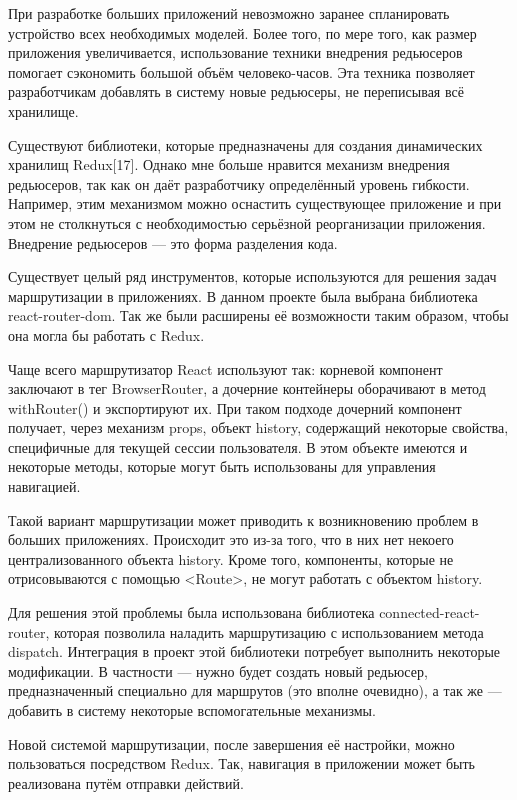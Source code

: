 При разработке больших приложений невозможно заранее спланировать устройство всех необходимых моделей.
Более того, по мере того, как размер приложения увеличивается, использование техники внедрения редьюсеров помогает сэкономить большой объём человеко-часов.
Эта техника позволяет разработчикам добавлять в систему новые редьюсеры, не переписывая всё хранилище.

Существуют библиотеки, которые предназначены для создания динамических хранилищ Redux[17].
Однако мне больше нравится механизм внедрения редьюсеров, так как он даёт разработчику определённый уровень гибкости.
Например, этим механизмом можно оснастить существующее приложение и при этом не столкнуться с необходимостью серьёзной реорганизации приложения.
Внедрение редьюсеров — это форма разделения кода.

Существует целый ряд инструментов, которые используются для решения задач маршрутизации в приложениях.
В данном проекте была выбрана библиотека react-router-dom.
Так же были расширены её возможности таким образом, чтобы она могла бы работать с Redux.

Чаще всего маршрутизатор React используют так: корневой компонент заключают в тег BrowserRouter, а дочерние контейнеры оборачивают в метод withRouter() и экспортируют их.
При таком подходе дочерний компонент получает, через механизм props, объект history, содержащий некоторые свойства, специфичные для текущей сессии пользователя.
В этом объекте имеются и некоторые методы, которые могут быть использованы для управления навигацией.

Такой вариант маршрутизации может приводить к возникновению проблем в больших приложениях.
Происходит это из-за того, что в них нет некоего централизованного объекта history.
Кроме того, компоненты, которые не отрисовываются с помощью <Route>, не могут работать с объектом history.

Для решения этой проблемы была использована библиотека connected-react-router, которая позволила наладить маршрутизацию с использованием метода dispatch.
Интеграция в проект этой библиотеки потребует выполнить некоторые модификации.
В частности — нужно будет создать новый редьюсер, предназначенный специально для маршрутов (это вполне очевидно), а так же — добавить в систему некоторые вспомогательные механизмы.

Новой системой маршрутизации, после завершения её настройки, можно пользоваться посредством Redux.
Так, навигация в приложении может быть реализована путём отправки действий.

